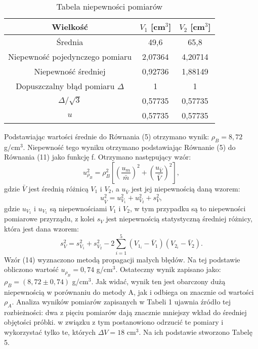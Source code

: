 \documentclass[10pt,a4paper]{article}
\begin{document}
  \begin{center}
 \begin{table}[h!]
 \label{4}
 \centering
 \caption{Tabela niepewności pomiarów }
 \begin{tabular}{|c|c|c|}
 \hline
 Wielkość &$V_{1}$ [cm$^{3}$] & $V_{2}$ [cm$^{3}$]  \\
 \hline
Średnia & 49,6 &65,8 \\
\hline
Niepewność pojedynczego pomiaru&2,07364&4,20714\\
\hline
Niepewność średniej&0,92736&1,88149\\
\hline
Dopuszczalny błąd pomiaru $\Delta$& 1&1\\
\hline
$\Delta / \sqrt{3}$&0,57735&0,57735\\
\hline
$u$&0,57735&0,57735\\
\hline
 \end{tabular}
 \end{table}
 \end{center}
 Podstawiając wartości średnie do Równania (5) otrzymano wynik: $\rho_{B}=8,72$ g/cm$^{3}$. Niepewność tego wyniku otrzymano podstawiając Równanie (5) do Równania (11) jako funkcję f. Otrzymano następujący wzór:
 \begin{equation}
  u_{\rho_{B}}^2=\rho_{B}^2 \left[ \left(\dfrac{u_{m}}{\bar{m}}\right)^2+\left(\dfrac{u_{\bar{V}}}{\bar{V}}\right)^2\right ],
 \end{equation}
 gdzie $\bar{V}$ jest średnią różnicą $V_{1}$ i $V_{2}$, a $u_{\bar{V}}$ jest jej niepewnością daną wzorem:
 \begin{equation}
 u_{\bar{V}}^2=u_{V_{1}}^2+u_{V_{2}}^2+s_{V}^2,
 \end{equation}
 gdzie $u_{V_{1}}$ i $u_{V_{1}}$ są niepewnościami $V_{1}$ i $V_{2}$, w tym przypadku są to niepewności pomiarowe przyrządu, z kolei $s_{V}$ jest niepewnością statystyczną średniej różnicy, która jest dana wzorem:
 \begin{equation*}
  s_{V}^2=s_{V_{1}}^2+s_{V_{2}}^2-2 \sum_{i=1}^{5} (V_{1_{i}}- \bar{V}_{1})(V_{2_{i}}- \bar{V}_{2}).
 \end{equation*}
  Wzór (14) wyznaczono metodą propagacji małych błędów.
  Na tej podstawie obliczono wartość $u_{\rho_{B}}=0,74$ g/cm$^{3}$. Ostateczny wynik zapisano jako: $\rho_{B}=(8,72\pm0,74)$ g/cm$^{3}$. Jak widać, wynik ten jest obarczony dużą niepewnością w porównaniu do metody A, jak i odbiega on znacznie od wartości $\rho_{A}$. Analiza wyników pomiarów zapisanych w Tabeli 1 ujawnia źródło tej rozbieżności: dwa z pięciu pomiarów dają znacznie mniejszy wkład do średniej objętości próbki. w związku z tym postanowiono odrzucić te pomiary i wykorzystać tylko te, których $\Delta V=18$ cm$^3$. Na ich podstawie stworzono Tabelę 5.
 
\end{document}

